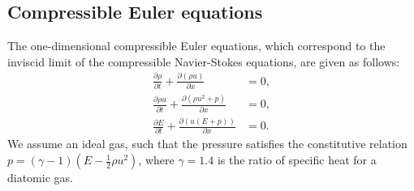 \documentclass[preprint,10pt]{elsarticle}
\theoremstyle{definition}
\theoremstyle{lemma}
\theoremstyle{theorem}
\theoremstyle{assumption}
\newcommand{\pd}[2]{\frac{\partial#1}{\partial#2}}
\newcommand{\LRp}[1]{\left( #1 \right)}
\newcommand{\LRc}[1]{\left\{ #1 \right\}}
\newcommand{\avg}[1] {\ensuremath{\LRc{\!\{#1\}\!}}}
\newcommand{\note}[1]{{\color{blue}{#1}}}
\begin{document}
%
%
%

\subsection{Compressible Euler equations}

The one-dimensional compressible Euler equations, which correspond to the inviscid limit of the compressible Navier-Stokes equations, are given as follows:
\begin{align*}
\pd{\rho}{t} + \pd{\LRp{\rho u}}{x} &= 0,\\
\pd{\rho u}{t} + \pd{\LRp{\rho u^2 + p }}{x} &= 0,\\
\pd{E}{t} + \pd{\LRp{u(E+p)}}{x} &= 0.
\end{align*}
We assume an ideal gas, such that the pressure satisfies the constitutive relation $p = (\gamma-1)\LRp{E - \frac{1}{2}\rho u^2}$, where $\gamma = 1.4$ is the ratio of specific heat for a diatomic gas.    
\end{document}

